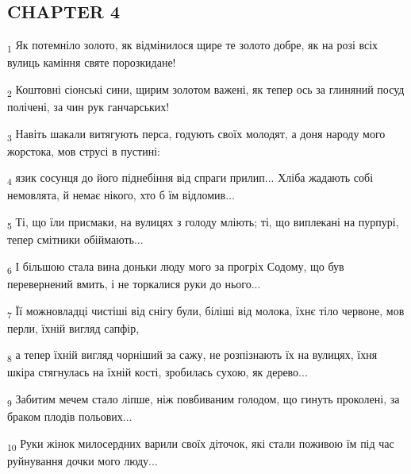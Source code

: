 \subsection{CHAPTER 4}
\begin{tcolorbox}
\textsubscript{1} Як потемніло золото, як відмінилося щире те золото добре, як на розі всіх вулиць каміння святе порозкидане!
\end{tcolorbox}
\begin{tcolorbox}
\textsubscript{2} Коштовні сіонські сини, щирим золотом важені, як тепер ось за глиняний посуд полічені, за чин рук ганчарських!
\end{tcolorbox}
\begin{tcolorbox}
\textsubscript{3} Навіть шакали витягують перса, годують своїх молодят, а доня народу мого жорстока, мов струсі в пустині:
\end{tcolorbox}
\begin{tcolorbox}
\textsubscript{4} язик сосунця до його піднебіння від спраги прилип... Хліба жадають собі немовлята, й немає нікого, хто б їм відломив...
\end{tcolorbox}
\begin{tcolorbox}
\textsubscript{5} Ті, що їли присмаки, на вулицях з голоду мліють; ті, що виплекані на пурпурі, тепер смітники обіймають...
\end{tcolorbox}
\begin{tcolorbox}
\textsubscript{6} І більшою стала вина доньки люду мого за прогріх Содому, що був перевернений вмить, і не торкалися руки до нього...
\end{tcolorbox}
\begin{tcolorbox}
\textsubscript{7} Її можновладці чистіші від снігу були, біліші від молока, їхнє тіло червоне, мов перли, їхній вигляд сапфір,
\end{tcolorbox}
\begin{tcolorbox}
\textsubscript{8} а тепер їхній вигляд чорніший за сажу, не розпізнають їх на вулицях, їхня шкіра стягнулась на їхній кості, зробилась сухою, як дерево...
\end{tcolorbox}
\begin{tcolorbox}
\textsubscript{9} Забитим мечем стало ліпше, ніж повбиваним голодом, що гинуть проколені, за браком плодів польових...
\end{tcolorbox}
\begin{tcolorbox}
\textsubscript{10} Руки жінок милосердних варили своїх діточок, які стали поживою їм під час руйнування дочки мого люду...
\end{tcolorbox}
